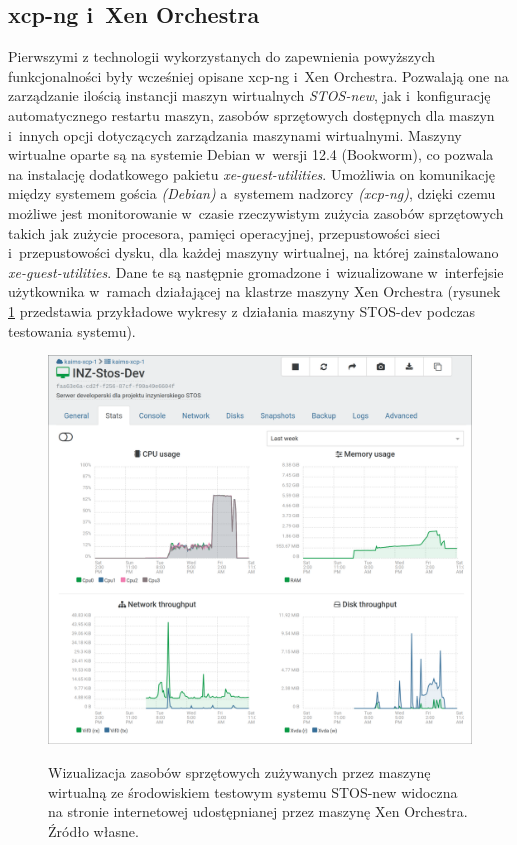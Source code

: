 \subsection{xcp-ng i~Xen Orchestra}
Pierwszymi z technologii wykorzystanych do zapewnienia powyższych funkcjonalności były wcześniej opisane xcp-ng i~Xen Orchestra. Pozwalają one na zarządzanie ilością instancji maszyn wirtualnych \textit{STOS-new}, jak i~konfigurację automatycznego restartu maszyn, zasobów sprzętowych dostępnych dla maszyn i~innych opcji dotyczących zarządzania maszynami wirtualnymi\cite{xoa, xcp}. Maszyny wirtualne oparte są na systemie Debian w~wersji 12.4 (Bookworm), co pozwala na instalację dodatkowego pakietu \textit{xe-guest-utilities}\cite{xe-guest}. Umożliwia on komunikację między systemem gościa \textit{(Debian)} a~systemem nadzorcy \textit{(xcp-ng)}, dzięki czemu możliwe jest monitorowanie w~czasie rzeczywistym zużycia zasobów sprzętowych takich jak zużycie procesora, pamięci operacyjnej, przepustowości sieci i~przepustowości dysku, dla każdej maszyny wirtualnej, na której zainstalowano \textit{xe-guest-utilities}. Dane te są następnie gromadzone i~wizualizowane w~interfejsie użytkownika w~ramach działającej na klastrze maszyny Xen Orchestra (rysunek \ref{xcpGuest} przedstawia przykładowe wykresy z działania maszyny STOS-dev podczas testowania systemu).
\begin{figure}[!h]
	\begin{center}
		\resizebox{0.9\textwidth}{!} {
			\includegraphics{img/4/xe-dashboard.png}
		}
		\caption[Dashboard Xen Orchestra]{Wizualizacja zasobów sprzętowych zużywanych przez maszynę wirtualną ze środowiskiem testowym systemu STOS-new widoczna na stronie internetowej udostępnianej przez maszynę Xen Orchestra. Źródło własne.}
		\label{xcpGuest}
	\end{center}
\end{figure}
